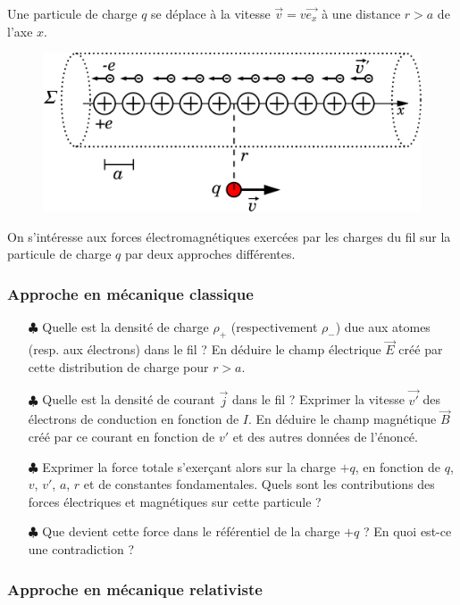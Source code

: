 \documentclass{report}
\begin{document}
Une particule de charge $q$ se déplace à la vitesse $\vec{v}=v\vec{e_{x}}$ à une distance $r>a$ de l'axe $x$.

\begin{figure}[h!]
\centering
		\includegraphics[scale=0.25]{cable.pdf}
\end{figure}

On s'intéresse aux forces électromagnétiques exercées par les charges du fil sur la particule de charge $q$ par deux approches différentes.

\subsubsection*{Approche en mécanique classique}

\begin{itemize}
	\item[$\clubsuit$] Quelle est la densité de charge $\rho_{+}$ (respectivement $\rho_{-}$) due aux atomes (resp. aux électrons) dans le fil ? En déduire le champ électrique $\vec{E}$ créé par cette distribution de charge pour $r>a$.
	
	\item[$\clubsuit$] Quelle est la densité de courant $\vec{j}$ dans le fil ? Exprimer la vitesse $\vec{v'}$ des électrons de conduction en fonction de $I$. En déduire le champ magnétique $\vec{B}$ créé par ce courant en fonction de $v'$ et des autres données de l'énoncé.
	\item[$\clubsuit$] Exprimer la force totale s'exerçant alors sur la charge $+q$, en fonction de $q$, $v$, $v'$, $a$, $r$ et de constantes fondamentales. Quels sont les contributions des forces électriques et magnétiques sur cette particule ?
	\item[$\clubsuit$] Que devient cette force dans le référentiel de la charge $+q$ ? En quoi est-ce une contradiction ?
\end{itemize}

\subsubsection*{Approche en mécanique relativiste}
\end{document}
